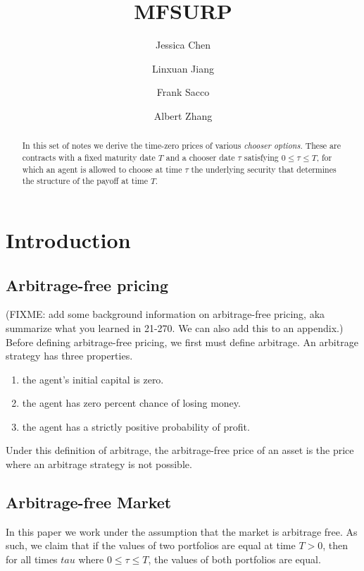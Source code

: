 \documentclass[reqno]{amsart}
\title{MFSURP}
\author{Jessica Chen}
\author{Linxuan Jiang}
\author{Frank Sacco}
\author{Albert Zhang}
\begin{document}
\begin{abstract}
    In this set of notes we derive the time-zero prices of various \emph{chooser options}. These are contracts with a fixed maturity date $T$ and a chooser date $\tau$ satisfying $0 \le \tau \le T$, for which an agent is allowed to choose at time $\tau$ the underlying security that determines the structure of the payoff at time $T$.  
\end{abstract}



\maketitle  
\tableofcontents

\section{Introduction}

\subsection{Arbitrage-free pricing}

(FIXME: add some background information on arbitrage-free pricing, aka summarize what you learned in 21-270. We can also add this to an appendix.)
Before defining arbitrage-free pricing, we first must define arbitrage. An arbitrage strategy has three properties. 
\begin{enumerate}
     \item the agent's initial capital is zero.
     \item the agent has zero percent chance of losing money.
     \item the agent has a strictly positive probability of profit. 
\end{enumerate}
Under this definition of arbitrage, the arbitrage-free price of an asset is the price where an arbitrage strategy is not possible.

\subsection{Arbitrage-free Market}

In this paper we work under the assumption that the market is arbitrage free. As such, we claim that if the values of two portfolios are equal at time $T > 0$, then for all times $tau$ where $0 \leq \tau \leq T$, the values of both portfolios are equal.
\end{document}

